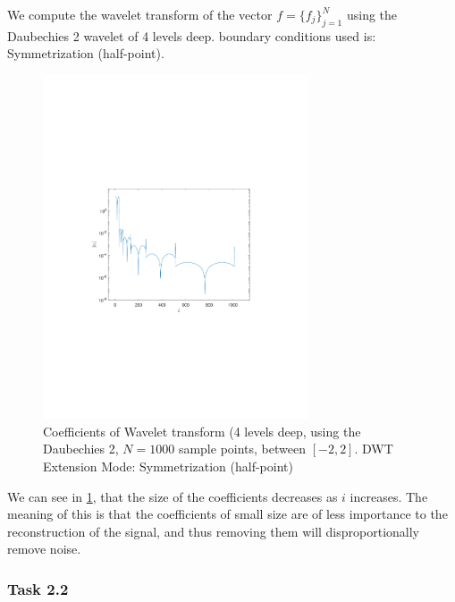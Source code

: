 \documentclass[a4paper]{article}
\begin{document}
    We compute the wavelet transform of the vector $f = \{f_j\}_{j=1}^N$ using the Daubechies 2 wavelet of 4 levels deep. boundary conditions used is: Symmetrization (half-point). 
    \begin{figure}[H]
	\centering
	\includegraphics[trim={3.5cm 8cm 4cm 9cm},clip,width=0.7\textwidth]{Images/Coefficents.pdf}
	\caption{Coefficients of Wavelet transform (4 levels deep, using the Daubechies 2, $N=1000$ sample points, between $[-2,2]$. DWT Extension Mode: Symmetrization (half-point)}
	\label{fig:Coeff}
    \end{figure}

    We can see in \cref{fig:Coeff}, that the size of the coefficients decreases as $i$ increases. The meaning of this is that the coefficients of small size are of less importance to the reconstruction of the signal, and thus removing them will disproportionally remove noise.

    \subsubsection{Task 2.2}
\end{document}
